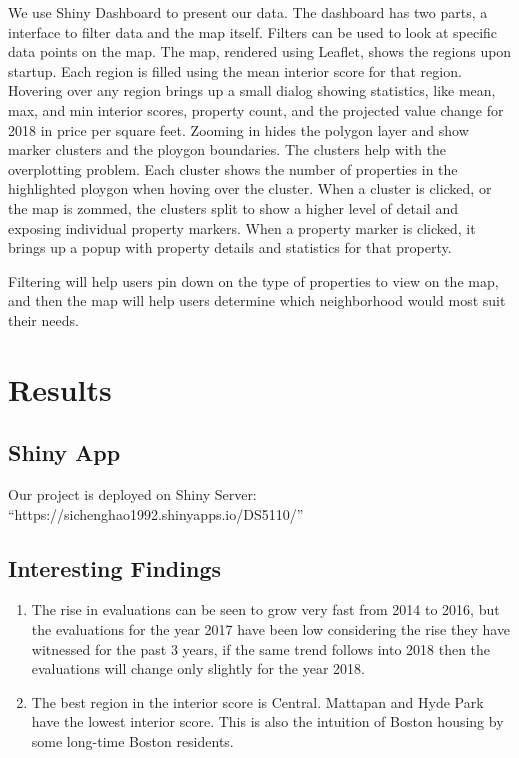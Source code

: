 \documentclass[12pt]{article}
\begin{document}
We use Shiny Dashboard \cite{ShinyDas50:online} to present our data. The 
dashboard has two parts, a interface to filter data and the map itself. 
Filters can be used to look at specific data points on the map. The map,
rendered using Leaflet, shows the regions upon startup. Each region is
filled using the mean interior score for that region. Hovering over any
region brings up a small dialog showing statistics, like mean, max, and
min interior scores, property count, and the projected value change for
2018 in price per square feet. Zooming in hides the polygon layer and
show marker clusters and the ploygon boundaries. The clusters help with
the overplotting problem. Each cluster shows the number of properties in
the highlighted ploygon when hoving over the cluster. When a cluster is
clicked, or the map is zommed, the clusters split to show a higher level
of detail and exposing individual property markers. When a property
marker is clicked, it brings up a popup with property details and
statistics for that property.

Filtering will help users pin down on the type of properties to view on
the map, and then the map will help users determine which neighborhood
would most suit their needs.

\section*{Results}

\subsection{Shiny App}

Our project is deployed on Shiny Server:
``https://sichenghao1992.shinyapps.io/DS5110/''


\subsection{Interesting Findings}
    \begin{enumerate}
        \item The rise in evaluations can be seen to grow very fast from 
            2014 to 2016, but the evaluations for the year 2017 have been 
            low considering the rise they have witnessed for the past 3 years, 
            if the same trend follows into 2018 then the evaluations will 
            change only slightly for the year 2018.
        \item The best region in the interior score is Central. Mattapan and 
            Hyde Park have the lowest interior score. This is also the intuition 
            of Boston housing by some long-time Boston residents. 
    \end{enumerate}
\end{document}
